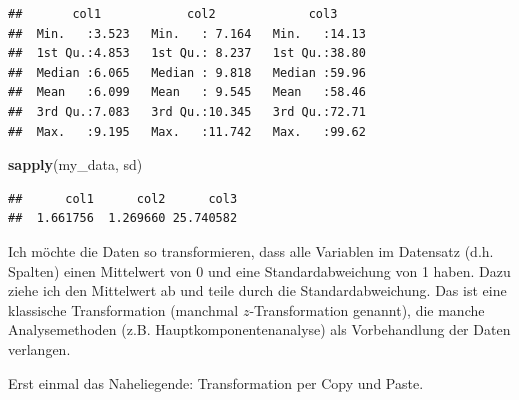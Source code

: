 \documentclass[]{book}
\newenvironment{Shaded}{\begin{snugshade}}{\end{snugshade}}
\newcommand{\DataTypeTok}[1]{\textcolor[rgb]{0.13,0.29,0.53}{#1}}
\newcommand{\KeywordTok}[1]{\textcolor[rgb]{0.13,0.29,0.53}{\textbf{#1}}}
\newcommand{\NormalTok}[1]{#1}
\newcommand{\OperatorTok}[1]{\textcolor[rgb]{0.81,0.36,0.00}{\textbf{#1}}}
\newcommand{\StringTok}[1]{\textcolor[rgb]{0.31,0.60,0.02}{#1}}
\begin{document}
\begin{verbatim}
##       col1            col2             col3      
##  Min.   :3.523   Min.   : 7.164   Min.   :14.13  
##  1st Qu.:4.853   1st Qu.: 8.237   1st Qu.:38.80  
##  Median :6.065   Median : 9.818   Median :59.96  
##  Mean   :6.099   Mean   : 9.545   Mean   :58.46  
##  3rd Qu.:7.083   3rd Qu.:10.345   3rd Qu.:72.71  
##  Max.   :9.195   Max.   :11.742   Max.   :99.62
\end{verbatim}

\begin{Shaded}
\begin{Highlighting}[]
\KeywordTok{sapply}\NormalTok{(my_data, sd)}
\end{Highlighting}
\end{Shaded}

\begin{verbatim}
##      col1      col2      col3 
##  1.661756  1.269660 25.740582
\end{verbatim}

Ich möchte die Daten so transformieren, dass alle Variablen im Datensatz (d.h. Spalten) einen Mittelwert von 0 und eine Standardabweichung von 1 haben. Dazu ziehe ich den Mittelwert ab und teile durch die Standardabweichung. Das ist eine klassische Transformation (manchmal \(z\)-Transformation genannt), die manche Analysemethoden (z.B. Hauptkomponentenanalyse) als Vorbehandlung der Daten verlangen.

Erst einmal das Naheliegende: Transformation per Copy und Paste.

\begin{Shaded}
\end{Shaded}
\end{document}
